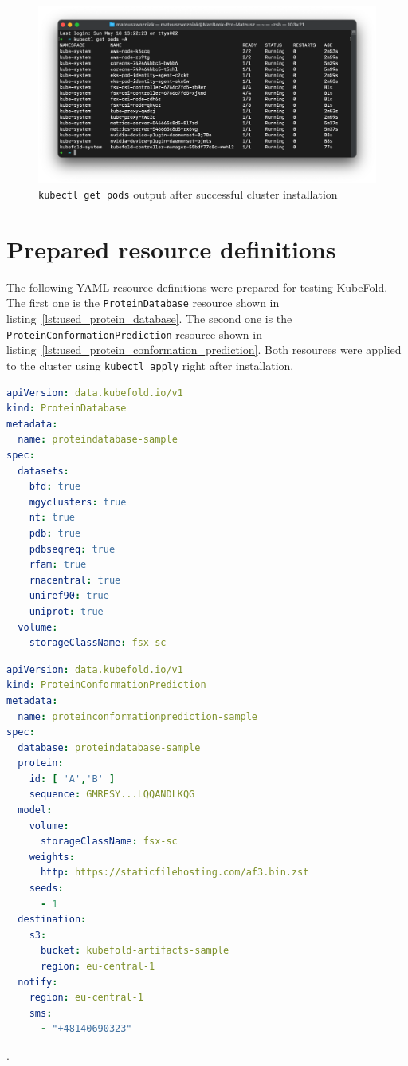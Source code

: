 \begin{figure}[htbp]
    \centering
    \includegraphics[width=\textwidth]{images/eks_pods_terminal}
    \caption{\texttt{kubectl get pods} output after successful cluster installation}
    \label{fig:eks_pods_terminal}
\end{figure}

\section{Prepared resource definitions}

The following YAML resource definitions were prepared for testing KubeFold.
The first one is the \texttt{ProteinDatabase} resource shown in listing~\ref{lst:used_protein_database}.
The second one is the \texttt{ProteinConformationPrediction} resource shown in listing~\ref{lst:used_protein_conformation_prediction}.
Both resources were applied to the cluster using \texttt{kubectl apply} right after installation.

\begin{lstlisting}[language=yaml,caption={Used \texttt{ProteinDatabase} resource definition},label={lst:used_protein_database}]
apiVersion: data.kubefold.io/v1
kind: ProteinDatabase
metadata:
  name: proteindatabase-sample
spec:
  datasets:
    bfd: true
    mgyclusters: true
    nt: true
    pdb: true
    pdbseqreq: true
    rfam: true
    rnacentral: true
    uniref90: true
    uniprot: true
  volume:
    storageClassName: fsx-sc
\end{lstlisting}

\begin{lstlisting}[language=yaml,caption={Used \texttt{ProteinConformationPrediction} resource definition},label={lst:used_protein_conformation_prediction}]
apiVersion: data.kubefold.io/v1
kind: ProteinConformationPrediction
metadata:
  name: proteinconformationprediction-sample
spec:
  database: proteindatabase-sample
  protein:
    id: [ 'A','B' ]
    sequence: GMRESY...LQQANDLKQG
  model:
    volume:
      storageClassName: fsx-sc
    weights:
      http: https://staticfilehosting.com/af3.bin.zst
    seeds:
      - 1
  destination:
    s3:
      bucket: kubefold-artifacts-sample
      region: eu-central-1
  notify:
    region: eu-central-1
    sms:
      - "+48140690323"
\end{lstlisting}.

